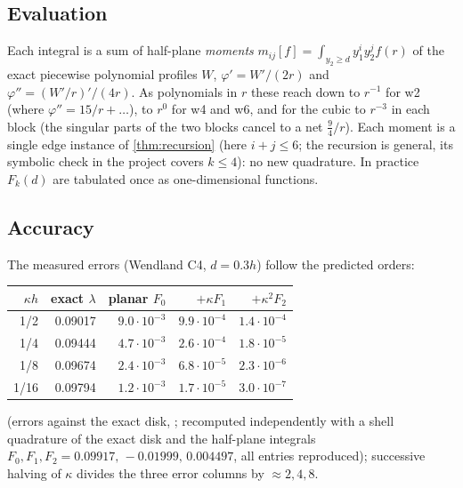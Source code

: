 \subsection{Evaluation}
Each integral is a sum of half-plane \emph{moments} $m_{ij}[f]=\int_{y_2\ge d}y_1^iy_2^jf(r)$ of the exact piecewise polynomial profiles $W$,
$\varphi'=W'/(2r)$ and $\varphi''=(W'/r)'/(4r)$. As polynomials in $r$ these reach down to $r^{-1}$ for w2 (where $\varphi''=15/r+\dots$), to $r^{0}$ for w4 and w6,
and for the cubic to $r^{-3}$ in each block (the singular parts of the two blocks cancel to a net $\frac94/r$). Each moment is a single edge
instance of \cref{thm:recursion} (here $i+j\le6$; the recursion is general, its symbolic check in the project covers $k\le4$): no new quadrature. In practice $F_k(d)$ are tabulated once as one-dimensional functions.

\subsection{Accuracy}
The measured errors (Wendland C4, $d=0.3h$) follow the predicted orders:
\begin{center}
\begin{tabular}{rrrrr}
\toprule
$\kappa h$ & exact $\lambda$ & planar $F_0$ & $+\kappa F_1$ & $+\kappa^2F_2$\\
\midrule
1/2 & 0.09017 & $9.0\!\cdot\!10^{-3}$ & $9.9\!\cdot\!10^{-4}$ & $1.4\!\cdot\!10^{-4}$\\
1/4 & 0.09444 & $4.7\!\cdot\!10^{-3}$ & $2.6\!\cdot\!10^{-4}$ & $1.8\!\cdot\!10^{-5}$\\
1/8 & 0.09674 & $2.4\!\cdot\!10^{-3}$ & $6.8\!\cdot\!10^{-5}$ & $2.3\!\cdot\!10^{-6}$\\
1/16& 0.09794 & $1.2\!\cdot\!10^{-3}$ & $1.7\!\cdot\!10^{-5}$ & $3.0\!\cdot\!10^{-7}$\\
\bottomrule
\end{tabular}
\end{center}
(errors against the exact disk, ; recomputed independently with a shell quadrature of the exact disk and the half-plane integrals $F_0,F_1,F_2=0.09917,\,-0.01999,\,0.004497$, all entries reproduced);
successive halving of $\kappa$ divides the three error columns by $\approx2,4,8$.

